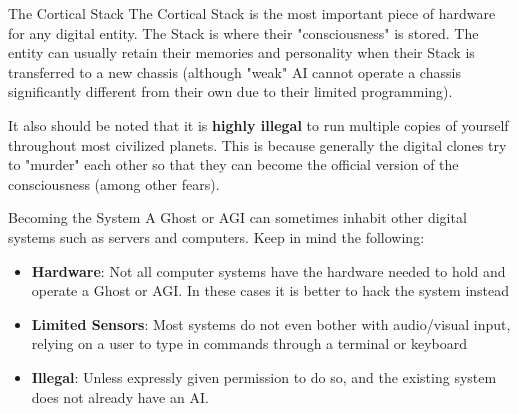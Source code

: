 \begin{genericsection}{The Cortical Stack}
The Cortical Stack is the most important piece of hardware for any digital entity. The Stack is where their "consciousness" is stored. The entity can usually retain their memories and personality when their Stack is transferred to a new chassis (although "weak" AI cannot operate a chassis significantly different from their own due to their limited programming).

It also should be noted that it is \textbf{highly illegal} to run multiple copies of yourself throughout most civilized planets. This is because generally the digital clones try to "murder" each other so that they can become the official version of the consciousness (among other fears).
\end{genericsection}

\begin{genericsection}{Becoming the System}
A Ghost or AGI can sometimes inhabit other digital systems such as servers and computers. Keep in mind the following:
\end{genericsection}

\begin{itemize}
  \item \textbf{Hardware}: Not all computer systems have the hardware needed to hold and operate a Ghost or AGI. In these cases it is better to hack the system instead\\
  \item \textbf{Limited Sensors}: Most systems do not even bother with audio/visual input, relying on a user to type in commands through a terminal or keyboard\\
  \item \textbf{Illegal}: Unless expressly given permission to do so, and the existing system does not already have an AI.\\
\end{itemize}
